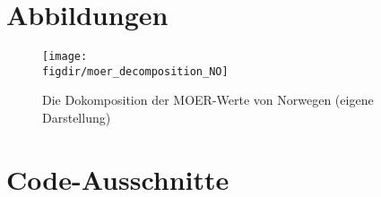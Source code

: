 \chapter{Abbildungen}
\begin{figure}
    \caption{Die Dokomposition der MOER-Werte von Norwegen (eigene Darstellung)}
    {\texttt{[image: \\figdir/moer\_decomposition\_NO]}}
    \label{FIG:moer_decomposition_NO}
\end{figure}


\chapter{Code-Ausschnitte}

